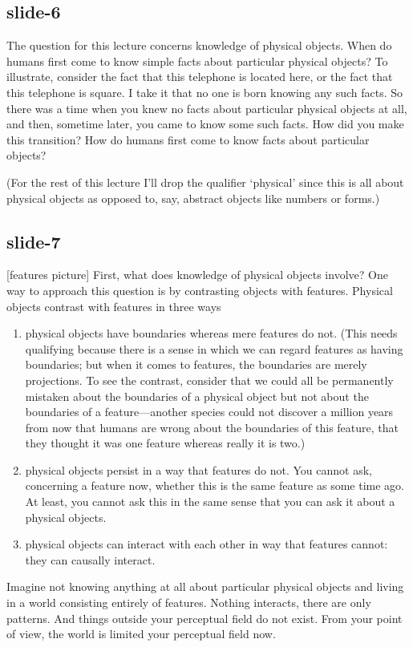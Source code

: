 \documentclass[12pt,\papersize]{extarticle}
\begin{document}
\subsection{slide-6}
The question for this lecture concerns knowledge of physical objects.
When do humans first come to know simple facts about particular physical objects?
To illustrate, consider the fact that this telephone is located here,
or the fact that this telephone is square.
I take it that no one is born knowing any such facts.
So there was a time when you knew no facts about particular physical objects at all,
and then, sometime later, you came to know some such facts.
How did you make this transition?
How do humans first come to know facts about particular objects?
 
(For the rest of this lecture 
I'll drop the qualifier `physical' since this is all about physical objects as opposed to, 
say, abstract objects like numbers or forms.)
 
\subsection{slide-7}
[features picture]
First, what does knowledge of physical objects involve?
One way to approach this question is by contrasting objects with features.
Physical objects contrast with features in three ways
%
\begin{enumerate}
%
\item physical objects have boundaries whereas mere features do not. (This needs qualifying 
because there is a sense in which we can regard features as having boundaries; but when it 
comes to 
features, the boundaries are merely projections.  To see the contrast, consider that we could 
all be permanently mistaken about the boundaries of a physical object but not about the 
boundaries of a feature---another species could not discover a million years from now that 
humans are wrong about the boundaries of this feature, that they thought it was one feature
whereas really it is two.)
%
\item physical objects persist in a way that features do not.  You cannot ask, concerning a 
feature now, whether this is the same feature as some time ago.  At least, you cannot ask this
in the same sense that you can ask it about a physical objects.
%
\item physical objects can interact with each other in way that features cannot: they
can causally interact.
%
\end{enumerate}
%
Imagine not knowing anything at all about particular physical objects and living in a world
consisting entirely of features.  Nothing interacts, there are only patterns.
And things outside your perceptual field do not exist.
From your point of view, the world is limited your perceptual field now.
 
\end{document}
